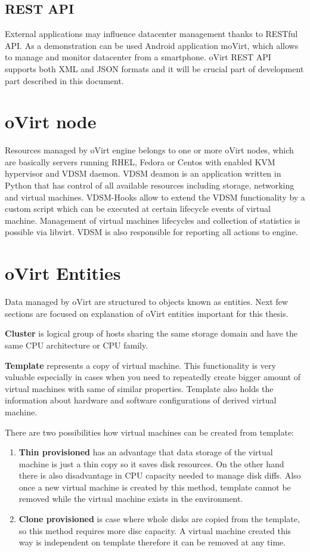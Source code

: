 \subsection{REST API}
External applications may influence datacenter management thanks to RESTful API. As a demonstration can be used Android application moVirt, which allows to manage and monitor datacenter from a smartphone. oVirt REST API supports both XML and JSON formats and it will be crucial part of development part described in this document.

\section{oVirt node}
Resources managed by oVirt engine belongs to one or more oVirt nodes, which are basically servers running RHEL, Fedora or Centos with enabled KVM\cite{kvm} hypervisor and VDSM daemon. VDSM deamon is an application written in Python that has control of all available resources including storage, networking and virtual machines. VDSM-Hooks\cite{hooks} allow to extend the VDSM functionality by a custom script which can be executed at certain lifecycle events of virtual machine. Management of virtual machines lifecycles and collection of statistics is possible via libvirt\cite{libvirt}. VDSM is also responsible for reporting all actions to engine.

\section{oVirt Entities}
Data managed by oVirt are structured to objects known as entities. Next few sections are focused on explanation of oVirt entities important for this thesis.

\textbf{Cluster} is logical group of hosts sharing the same storage domain and have the same CPU architecture or CPU family.

\textbf{Template} represents a copy of virtual machine. This functionality is very valuable especially in cases when you need to repeatedly create bigger amount of virtual machines with same of similar properties. Template also holds the information about hardware and software configurations of derived virtual machine. 

\noindent There are two possibilities how virtual machines can be created from template: 
\begin{enumerate}

\item \textbf{Thin provisioned} has an advantage that data storage of the virtual machine is just a thin copy so it saves disk resources. On the other hand there is also disadvantage in CPU capacity needed to manage disk diffs. Also once a new virtual machine is created by this method, template cannot be removed while the virtual machine exists in the environment. 

\item \textbf{Clone provisioned} is case where whole disks are copied from the template, so this method requires more disc capacity. A virtual machine created this way is independent on template therefore it can be removed at any time. 
\end{enumerate} 


